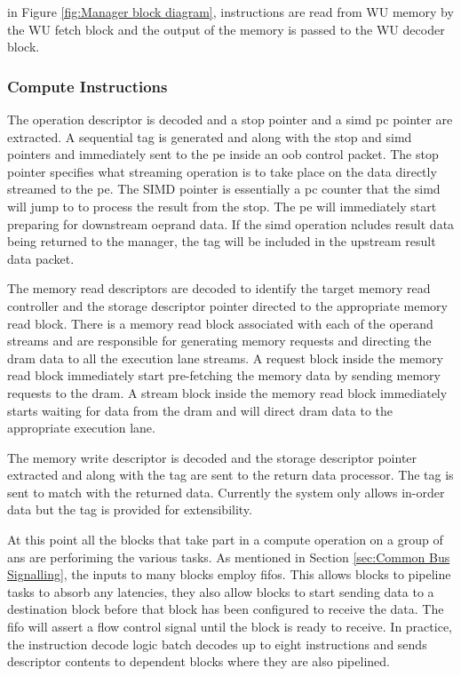 in Figure \ref{fig:Manager block diagram}, instructions are read from WU memory by the WU fetch block and the output of the memory is passed to the WU decoder block.

\subsubsection{Compute Instructions}
\label{sec:Decoding Compute Instructions}

The operation descriptor is decoded and a \ac{stop} pointer and a \ac{simd} \ac{pc} pointer are extracted. 
A sequential tag is generated and along with the \ac{stop} and \ac{simd} pointers and immediately sent to the \ac{pe} inside an \ac{oob} control packet.
The \ac{stop} pointer specifies what streaming operation is to take place on the data directly streamed to the \ac{pe}. 
The SIMD pointer is essentially a \ac{pc} counter that the \ac{simd} will jump to to process the result from the \ac{stop}.
The \ac{pe} will immediately start preparing for downstream oeprand data.
If the \ac{simd} operation ncludes result data being returned to the manager, the tag will be included in the upstream result data packet.

The memory read descriptors are decoded to identify the target memory read controller and the storage descriptor pointer directed to the appropriate memory read block.
There is a memory read block associated with each of the operand streams and are responsible for generating memory requests and directing the \ac{dram} data to all the execution lane streams.
A request block inside the memory read block immediately start pre-fetching the memory data by sending memory requests to the \ac{dram}.
A stream block inside the memory read block immediately starts waiting for data from the \ac{dram} and will direct \ac{dram} data to the appropriate execution lane.

The memory write descriptor is decoded and the storage descriptor pointer extracted and along with the tag are sent to the return data processor. The tag is sent to match with the returned data.
Currently the system only allows in-order data but the tag is provided for extensibility.

At this point all the blocks that take part in a compute operation on a group of \acp{an} are perforiming the various tasks.
As mentioned in Section \ref{sec:Common Bus Signalling}, the inputs to many blocks employ \acp{fifo}. 
This allows blocks to pipeline tasks to absorb any latencies, they also allow blocks to start sending data to a destination block before that block has been configured to receive the data.
The \ac{fifo} will assert a flow control signal until the block is ready to receive.
In practice, the instruction decode logic batch decodes up to eight instructions and sends descriptor contents to dependent blocks where they are also pipelined.

